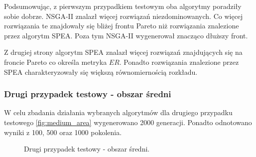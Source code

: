\documentclass[twoside]{iisthesis}
\begin{document}
Podsumowując, z pierwszym przypadkiem testowym oba algorytmy poradziły sobie dobrze. NSGA-II znalazł więcej rozwiązań niezdominowanych. Co więcej rozwiązania te znajdowały się bliżej frontu Pareto niż rozwiązania znalezione przez algorytm SPEA. Poza tym NSGA-II wygenerował znacząco dłuższy front.

Z drugiej strony algorytm SPEA znalazł więcej rozwiązań znajdujących się na froncie Pareto co określa metryka $ER$. Ponadto rozwiązania znalezione przez SPEA charakteryzowały się większą równomiernością rozkładu.\newpage
\subsubsection{Drugi przypadek testowy - obszar średni}
W celu zbadania działania wybranych algorytmów dla drugiego przypadku testowego \eqref{fig:medium_area} wygenerowano 2000 generacji. Ponadto odnotowano wyniki z 100, 500 oraz 1000 pokolenia.
\begin{figure}[H]
	\centering
	\caption{Drugi przypadek testowy - obszar średni.}
	\label{fig:medium_area}
\end{figure}
\end{document}

